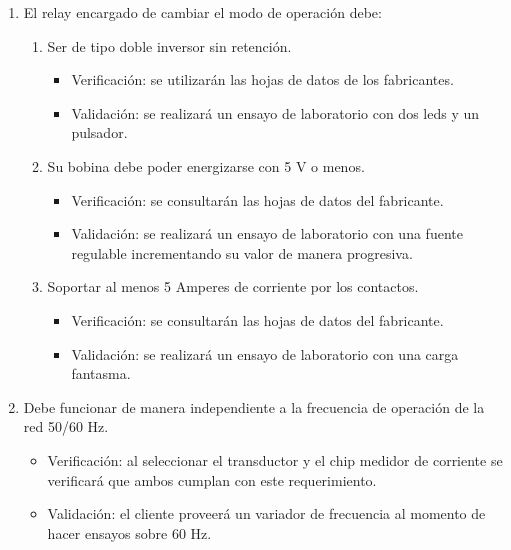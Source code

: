 \documentclass[11pt]{charter}
\begin{document}
\begin{enumerate}
\begin{enumerate}[label*=\arabic*.]
			\item El relay encargado de cambiar el modo de operación debe:
			\begin{enumerate}[label*=\arabic*.]
				\item Ser de tipo doble inversor sin retención.
					\begin{itemize}
						\item Verificación: se utilizarán las hojas de datos de los fabricantes.\\
						\item Validación: se realizará un ensayo de laboratorio con dos leds y un pulsador.\\
					\end{itemize}
				\item Su bobina debe poder energizarse con 5 V o menos.
					\begin{itemize}
						\item Verificación: se consultarán las hojas de datos del fabricante.\\
						\item Validación: se realizará un ensayo de laboratorio con una fuente regulable incrementando su valor de manera progresiva.\\
					\end{itemize}
				\item Soportar al menos 5 Amperes de corriente por los contactos.
					\begin{itemize}
						\item Verificación: se consultarán las hojas de datos del fabricante.\\
						\item Validación: se realizará un ensayo de laboratorio con una carga fantasma.\\
					\end{itemize}
			\end{enumerate}
			
			\item Debe funcionar de manera independiente a la frecuencia de operación de la red 50/60 Hz.
				\begin{itemize}
					\item Verificación: al seleccionar el transductor y el chip medidor de corriente se verificará que ambos cumplan con este requerimiento.\\
					\item Validación: el cliente proveerá un variador de frecuencia al momento de hacer ensayos sobre 60 Hz.\\
				\end{itemize}
			

\end{enumerate}
\end{enumerate}
\end{document}
